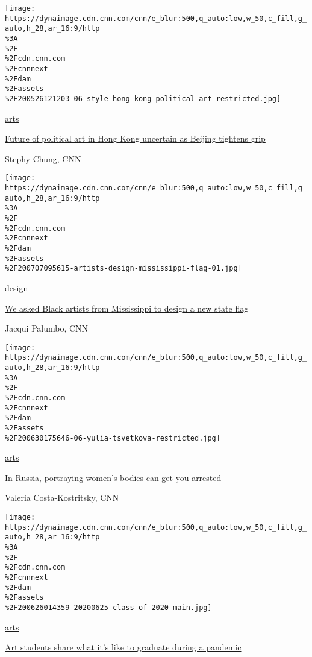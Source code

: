 \href{/style/article/hong-kong-protests-political-art-intl-hnk/index.html}{}

\texttt{[image: https://dynaimage.cdn.cnn.com/cnn/e\_blur:500,q\_auto:low,w\_50,c\_fill,g\_auto,h\_28,ar\_16:9/http\\\%3A\\\%2F\\\%2Fcdn.cnn.com\\\%2Fcnnnext\\\%2Fdam\\\%2Fassets\\\%2F200526121203-06-style-hong-kong-political-art-restricted.jpg]}

\href{/style/arts}{arts}

\href{/style/article/hong-kong-protests-political-art-intl-hnk/index.html}{Future
of political art in Hong Kong uncertain as Beijing tightens grip}

Stephy Chung, CNN

\href{/style/article/artists-design-mississippi-flag/index.html}{}

\texttt{[image: https://dynaimage.cdn.cnn.com/cnn/e\_blur:500,q\_auto:low,w\_50,c\_fill,g\_auto,h\_28,ar\_16:9/http\\\%3A\\\%2F\\\%2Fcdn.cnn.com\\\%2Fcnnnext\\\%2Fdam\\\%2Fassets\\\%2F200707095615-artists-design-mississippi-flag-01.jpg]}

\href{/style/design}{design}

\href{/style/article/artists-design-mississippi-flag/index.html}{We
asked Black artists from Mississippi to design a new state flag}

Jacqui Palumbo, CNN

\href{/style/article/yulia-tsvetkova-pornography-gay-propaganda-law-lgbtq-activism-russia/index.html}{}

\texttt{[image: https://dynaimage.cdn.cnn.com/cnn/e\_blur:500,q\_auto:low,w\_50,c\_fill,g\_auto,h\_28,ar\_16:9/http\\\%3A\\\%2F\\\%2Fcdn.cnn.com\\\%2Fcnnnext\\\%2Fdam\\\%2Fassets\\\%2F200630175646-06-yulia-tsvetkova-restricted.jpg]}

\href{/style/arts}{arts}

\href{/style/article/yulia-tsvetkova-pornography-gay-propaganda-law-lgbtq-activism-russia/index.html}{In
Russia, portraying women's bodies can get you arrested}

Valeria Costa-Kostritsky, CNN

\href{/style/article/students-graduating-pandemic/index.html}{}

\texttt{[image: https://dynaimage.cdn.cnn.com/cnn/e\_blur:500,q\_auto:low,w\_50,c\_fill,g\_auto,h\_28,ar\_16:9/http\\\%3A\\\%2F\\\%2Fcdn.cnn.com\\\%2Fcnnnext\\\%2Fdam\\\%2Fassets\\\%2F200626014359-20200625-class-of-2020-main.jpg]}

\href{/style/arts}{arts}

\href{/style/article/students-graduating-pandemic/index.html}{Art
students share what it's like to graduate during a pandemic}

